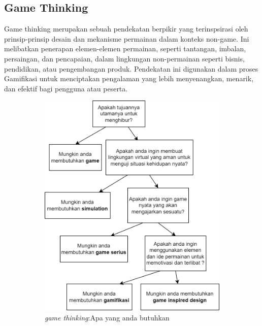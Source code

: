 \subsection{Game Thinking}
Game thinking merupakan sebuah pendekatan berpikir yang terinspsirasi oleh prinsip-prinsip desain dan mekanisme permainan dalam konteks non-game. 
Ini melibatkan penerapan elemen-elemen permainan, seperti tantangan, imbalan, persaingan, dan pencapaian, dalam lingkungan non-permainan seperti bisnis, pendidikan, atau pengembangan produk.
Pendekatan ini digunakan dalam proses Gamifikasi untuk menciptakan pengalaman yang lebih menyenangkan, menarik, dan efektif bagi pengguna atau peserta.
\begin{figure}[H]
	\centering
	\begin{subfigure}[b]{0.4\textwidth}
		\centering
	  \includegraphics[width=\linewidth]{contents/chapter-2/images/Game-thinking-2.png}
	  \caption{\textit{game thinking}:Apa yang anda butuhkan}
	  \label{fig:sub-gamethink-1}
	\end{subfigure}
	\hfill
	\begin{subfigure}[b]{0.4\textwidth}
	\centering

\end{subfigure}
\end{figure}
